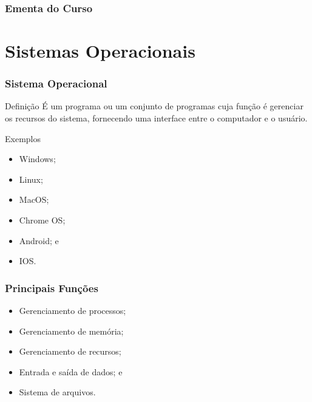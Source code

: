 \documentclass[aspectratio=169]{beamer} %
\begin{document}
\begin{frame}
	\frametitle{Ementa do Curso}
  	\tableofcontents
\end{frame}


\section{Sistemas Operacionais}

\begin{frame}
	\frametitle{Sistema Operacional}
	
	\begin{block}{Definição}
		É um programa ou um conjunto de programas cuja função é gerenciar os recursos do sistema, fornecendo uma interface entre o computador e o usuário.	
	\end{block}\vfill
	
	\begin{exampleblock}{Exemplos}
		\begin{itemize}
			\item Windows;
			\item Linux;
			\item MacOS;
			\item Chrome OS; 
			\item Android; e
			\item IOS.
		\end{itemize}
	\end{exampleblock}
\end{frame}

\begin{frame}
	\frametitle{Principais Funções}
	
	\begin{itemize}
		\item Gerenciamento de processos;
		\item Gerenciamento de memória;
		\item Gerenciamento de recursos;
		\item Entrada e saída de dados; e
		\item Sistema de arquivos.
	\end{itemize}
\end{frame}
\end{document}
